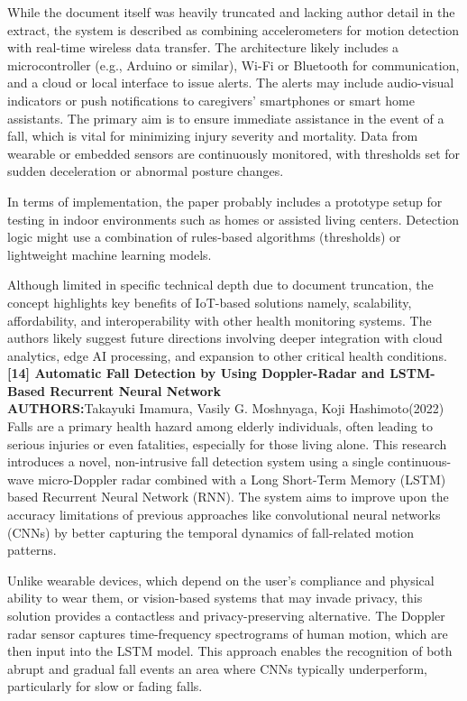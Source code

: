 \documentclass[a4paper, 12pt]{report}
\begin{document}
While the document itself was heavily truncated and lacking author detail in the extract, the system is described as combining accelerometers for motion detection with real-time wireless data transfer. The architecture likely includes a microcontroller (e.g., Arduino or similar), Wi-Fi or Bluetooth for communication, and a cloud or local interface to issue alerts. The alerts may include audio-visual indicators or push notifications to caregivers' smartphones or smart home assistants.
The primary aim is to ensure immediate assistance in the event of a fall, which is vital for minimizing injury severity and mortality. Data from wearable or embedded sensors are continuously monitored, with thresholds set for sudden deceleration or abnormal posture changes.

In terms of implementation, the paper probably includes a prototype setup for testing in indoor environments such as homes or assisted living centers. Detection logic might use a combination of rules-based algorithms (thresholds) or lightweight machine learning models.

Although limited in specific technical depth due to document truncation, the concept highlights key benefits of IoT-based solutions namely, scalability, affordability, and interoperability with other health monitoring systems. The authors likely suggest future directions involving deeper integration with cloud analytics, edge AI processing, and expansion to other critical health conditions.\\

\noindent\textbf{[14] Automatic Fall Detection by Using Doppler-Radar and LSTM-Based Recurrent Neural Network}\\
\textbf{AUTHORS:}Takayuki Imamura, Vasily G. Moshnyaga, Koji Hashimoto(2022)
Falls are a primary health hazard among elderly individuals, often leading to serious injuries or even fatalities, especially for those living alone. This research introduces a novel, non-intrusive fall detection system using a single continuous-wave micro-Doppler radar combined with a Long Short-Term Memory (LSTM) based Recurrent Neural Network (RNN). The system aims to improve upon the accuracy limitations of previous approaches like convolutional neural networks (CNNs) by better capturing the temporal dynamics of fall-related motion patterns.

Unlike wearable devices, which depend on the user's compliance and physical ability to wear them, or vision-based systems that may invade privacy, this solution provides a contactless and privacy-preserving alternative. The Doppler radar sensor captures time-frequency spectrograms of human motion, which are then input into the LSTM model. This approach enables the recognition of both abrupt and gradual fall events an area where CNNs typically underperform, particularly for slow or fading falls.
\end{document}
